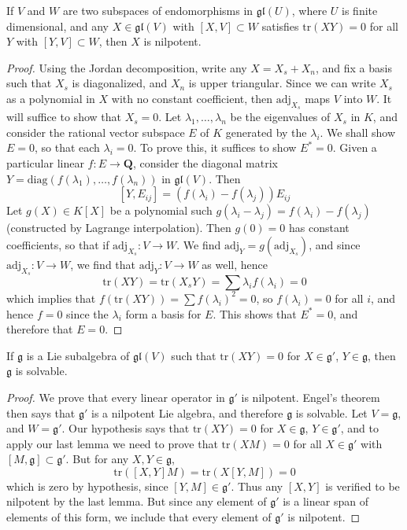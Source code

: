 \begin{lemma}
    If $V$ and $W$ are two subspaces of endomorphisms in $\mathfrak{gl}(U)$, where $U$ is finite dimensional, and any $X \in \mathfrak{gl}(V)$ with $[X,V] \subset W$ satisfies $\text{tr}(XY) = 0$ for all $Y$ with $[Y,V] \subset W$, then $X$ is nilpotent.
\end{lemma}
\begin{proof}
    Using the Jordan decomposition, write any $X = X_s + X_n$, and fix a basis such that $X_s$ is diagonalized, and $X_n$ is upper triangular. Since we can write $X_s$ as a polynomial in $X$ with no constant coefficient, then $\text{adj}_{X_s}$ maps $V$ into $W$. It will suffice to show that $X_s = 0$. Let $\lambda_1, \dots, \lambda_n$ be the eigenvalues of $X_s$ in $K$, and consider the rational vector subspace $E$ of $K$ generated by the $\lambda_i$. We shall show $E = 0$, so that each $\lambda_i = 0$. To prove this, it suffices to show $E^* = 0$. Given a particular linear $f: E \to \mathbf{Q}$, consider the diagonal matrix $Y = \text{diag}(f(\lambda_1), \dots, f(\lambda_n))$ in $\mathfrak{gl}(V)$. Then
    \[ [Y,E_{ij}] = (f(\lambda_i) - f(\lambda_j)) E_{ij} \]
    Let $g(X) \in K[X]$ be a polynomial such $g(\lambda_i - \lambda_j) = f(\lambda_i) - f(\lambda_j)$ (constructed by Lagrange interpolation). Then $g(0) = 0$ has constant coefficients, so that if $\text{adj}_{X_s}: V \to W$. We find $\text{adj}_Y = g(\text{adj}_{X_s})$, and since $\text{adj}_{X_s}: V \to W$, we find that $\text{adj}_Y: V \to W$ as well, hence
    \[ \text{tr}(XY) = \text{tr}(X_sY) = \sum \lambda_i f(\lambda_i) = 0 \]
    which implies that $f(\text{tr}(XY)) = \sum f(\lambda_i)^2 = 0$, so $f(\lambda_i) = 0$ for all $i$, and hence $f = 0$ since the $\lambda_i$ form a basis for $E$. This shows that $E^* = 0$, and therefore that $E = 0$.
\end{proof}

\begin{theorem}
    If $\mathfrak{g}$ is a Lie subalgebra of $\mathfrak{gl}(V)$ such that $\text{tr}(XY) = 0$ for $X \in \mathfrak{g}'$, $Y \in \mathfrak{g}$, then $\mathfrak{g}$ is solvable.
\end{theorem}
\begin{proof}
    We prove that every linear operator in $\mathfrak{g}'$ is nilpotent. Engel's theorem then says that $\mathfrak{g}'$ is a nilpotent Lie algebra, and therefore $\mathfrak{g}$ is solvable. Let $V = \mathfrak{g}$, and $W = \mathfrak{g}'$. Our hypothesis says that $\text{tr}(XY) = 0$ for $X \in \mathfrak{g}$, $Y \in \mathfrak{g}'$, and to apply our last lemma we need to prove that $\text{tr}(XM) = 0$ for all $X \in \mathfrak{g}'$ with $[M,\mathfrak{g}] \subset \mathfrak{g}'$. But for any $X,Y \in \mathfrak{g}$,
    \[ \text{tr}([X,Y]M) = \text{tr}(X[Y,M]) = 0 \]
    which is zero by hypothesis, since $[Y,M] \in \mathfrak{g}'$. Thus any $[X,Y]$ is verified to be nilpotent by the last lemma. But since any element of $\mathfrak{g}'$ is a linear span of elements of this form, we include that every element of $\mathfrak{g}'$ is nilpotent.
\end{proof}

